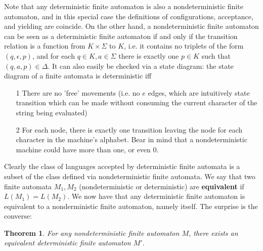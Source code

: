 \documentclass{article}
\theoremstyle{definition}
\theoremstyle{plain}
\theoremstyle{theorem}
\newtheorem{theorem}{Theorem}[section]
\begin{document}
Note that any deterministic finite automaton is also a nondeterministic finite automaton, and in this special case the definitions of configurations, acceptance, and yielding are coincide. On the other hand, a nondeterministic finite automaton can be seen as a deterministic finite automaton if and only if the transition relation is a function from $K \times \Sigma$ to $K$, i.e. it contains no triplets of the form $(q,\epsilon,p)$, and for each $q \in K, a \in \Sigma$ there is exactly one $p \in K$ such that $(q,a,p) \in \Delta$. It can also easily be checked via a state diagram: the state diagram of a finite automata is deterministic iff
\begin{itemize}
	\item[1] There are no 'free' movements (i.e. no $e$ edges, which are intuitively state transition which can be made without consuming the current character of the string being evaluated)
	\item[2] For each node, there is exactly one transition leaving the node for each character in the machine's alphabet. Bear in mind that a nondeterministic machine could have more than one, or even $0$.
\end{itemize} 
Clearly the class of languages accepted by deterministic finite automata is a subset of the class defined via nondeterministic finite automata. We say that two finite automata $M_1,M_2$ (nondeterministic or deterministic) are \textbf{equivalent} if $L(M_1) = L(M_2)$. We now have that any deterministic finite automaton is equivalent to a nonderministic finite automaton, namely itself. The surprise is the converse:
\begin{theorem}
	For any nondeterministic finite automaton $M$, there exists an equivalent deterministic finite automaton $M'$.
\end{theorem}
\end{document}
